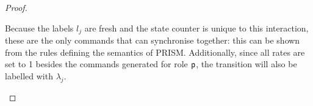\begin{proof}
\begin{itemize}
    Because the labels $l_j$ are fresh and the state counter is unique
    to this interaction, these are the only commands that can
    synchronise together: this can be shown from the rules defining
    the semantics of PRISM. Additionally, since all rates are set to 1
    besides the commands generated for role $\textsf{p}$, the transition
    will also be labelled with $\lambda_j$.

  \end{itemize}
\end{proof}

